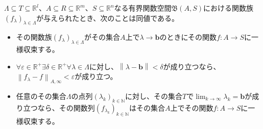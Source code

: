 \documentclass[dvipdfmx]{jsarticle}
\begin{document}
\begin{thm}\label{4.1.11.10}
$\varLambda \subseteq T \subseteq \mathbb{R}^{l}$、$A \subseteq R \subseteq \mathbb{R}^{m}$、$S \subseteq \mathbb{R}^{n}$なる有界関数空間$\mathfrak{B}(A,S)$における関数族$\left( f_{\lambda} \right)_{\lambda \in \varLambda}$が与えられたとき、次のことは同値である。
\begin{itemize}
\item
  その関数族$\left( f_{\lambda} \right)_{\lambda \in \varLambda}$がその集合$A$上で$\lambda \rightarrow \mathbf{b}$のときにその関数$f:A \rightarrow S$に一様収束する。
\item
  $\forall\varepsilon \in \mathbb{R}^{+}\exists\delta \in \mathbb{R}^{+}\forall\lambda \in \varLambda$に対し、$\left\| \lambda - \mathbf{b} \right\| < \delta$が成り立つなら、$\left\| f_{\lambda} - f \right\|_{A,\infty} < \varepsilon$が成り立つ。
\item
  任意のその集合$\varLambda$の点列$\left( \lambda_{k} \right)_{k \in \mathbb{N}}$に対し、その集合$T$で$\lim_{k \rightarrow \infty}\lambda_{k} = \mathbf{b}$が成り立つなら、その関数列$\left( f_{\lambda_{k}} \right)_{k \in \mathbb{N}}$はその集合$A$上でその関数$f:A \rightarrow S$に一様収束する。
\end{itemize}
\end{thm}
\end{document}
